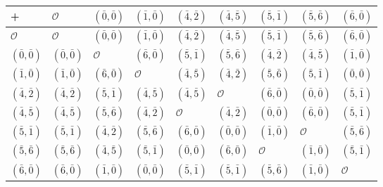 \begin{tabular}{l|llllllll}
  + & $\mathcal{O}$ & $(\bar{0},\bar{0})$ & $(\bar{1},\bar{0})$ & $(\bar{4},\bar{2})$ & $(\bar{4},\bar{5})$ & $(\bar{5},\bar{1})$ & $(\bar{5},\bar{6})$ & $(\bar{6},\bar{0})$ \\
\hline
  $\mathcal{O}$ & $\mathcal{O}$ & $(\bar{0},\bar{0})$ & $(\bar{1},\bar{0})$ & $(\bar{4},\bar{2})$ & $(\bar{4},\bar{5})$ & $(\bar{5},\bar{1})$ & $(\bar{5},\bar{6})$ & $(\bar{6},\bar{0})$ \\ 
  $(\bar{0},\bar{0})$ & $(\bar{0},\bar{0})$ & $\mathcal{O}$ & $(\bar{6},\bar{0})$ & $(\bar{5},\bar{1})$ & $(\bar{5},\bar{6})$ & $(\bar{4},\bar{2})$ & $(\bar{4},\bar{5})$ & $(\bar{1},\bar{0})$ \\
  $(\bar{1},\bar{0})$ & $(\bar{1},\bar{0})$ & $(\bar{6},\bar{0})$ & $\mathcal{O}$ & $(\bar{4},\bar{5})$ & $(\bar{4},\bar{2})$ & $(\bar{5},\bar{6})$ & $(\bar{5},\bar{1})$ & $(\bar{0},\bar{0})$ \\
  $(\bar{4},\bar{2})$ & $(\bar{4},\bar{2})$ & $(\bar{5},\bar{1})$ & $(\bar{4},\bar{5})$ & $(\bar{4},\bar{5})$ & $\mathcal{O}$ & $(\bar{6},\bar{0})$ & $(\bar{0},\bar{0})$ & $(\bar{5},\bar{1})$  \\
  $(\bar{4},\bar{5})$ & $(\bar{4},\bar{5})$ & $(\bar{5},\bar{6})$ & $(\bar{4},\bar{2})$ & $\mathcal{O}$ & $(\bar{4},\bar{2})$ & $(\bar{0},\bar{0})$ & $(\bar{6},\bar{0})$ & $(\bar{5},\bar{1})$ \\
  $(\bar{5},\bar{1})$ & $(\bar{5},\bar{1})$ & $(\bar{4},\bar{2})$ & $(\bar{5},\bar{6})$ & $(\bar{6},\bar{0})$ & $(\bar{0},\bar{0})$ & $(\bar{1},\bar{0})$ & $\mathcal{O}$ & $(\bar{5},\bar{6})$ \\
  $(\bar{5},\bar{6})$ & $(\bar{5},\bar{6})$ & $(\bar{4},\bar{5})$ & $(\bar{5},\bar{1})$ & $(\bar{0},\bar{0})$ & $(\bar{6},\bar{0})$ & $\mathcal{O}$ & $(\bar{1},\bar{0})$ & $(\bar{5},\bar{1})$ \\
  $(\bar{6},\bar{0})$ & $(\bar{6},\bar{0})$ & $(\bar{1},\bar{0})$ & $(\bar{0},\bar{0})$ & $(\bar{5},\bar{1})$ & $(\bar{5},\bar{1})$ & $(\bar{5},\bar{6})$ & $(\bar{1},\bar{0})$ & $\mathcal{O}$ \\
\end{tabular}
